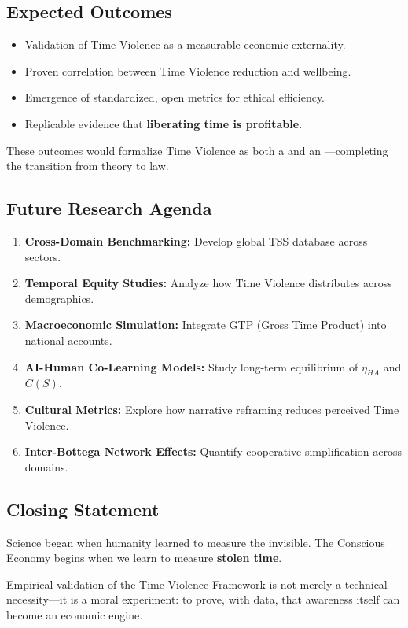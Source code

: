 \subsection{Expected Outcomes}
\label{sec:expected-outcomes}

\begin{itemize}
    \item Validation of Time Violence as a measurable economic externality.
    \item Proven correlation between Time Violence reduction and wellbeing.
    \item Emergence of standardized, open metrics for ethical efficiency.
    \item Replicable evidence that \textbf{liberating time is profitable}.
\end{itemize}

These outcomes would formalize Time Violence as both a  and an —completing the transition from theory to law.

\subsection{Future Research Agenda}
\label{sec:future-research}

\begin{enumerate}
    \item \textbf{Cross-Domain Benchmarking:} Develop global TSS database across sectors.
    \item \textbf{Temporal Equity Studies:} Analyze how Time Violence distributes across demographics.
    \item \textbf{Macroeconomic Simulation:} Integrate GTP (Gross Time Product) into national accounts.
    \item \textbf{AI-Human Co-Learning Models:} Study long-term equilibrium of $\eta_{HA}$ and $C(S)$.
    \item \textbf{Cultural Metrics:} Explore how narrative reframing reduces perceived Time Violence.
    \item \textbf{Inter-Bottega Network Effects:} Quantify cooperative simplification across domains.
\end{enumerate}

\subsection{Closing Statement}
\label{sec:empirical-closing}

Science began when humanity learned to measure the invisible. The Conscious Economy begins when we learn to measure \textbf{stolen time}.

Empirical validation of the Time Violence Framework is not merely a technical necessity—it is a moral experiment: to prove, with data, that awareness itself can become an economic engine.
